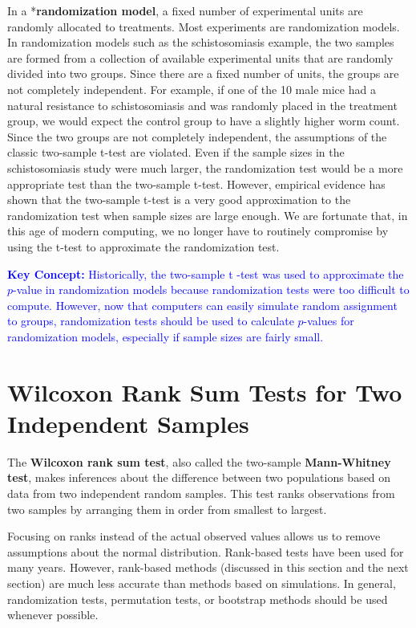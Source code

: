 \documentclass[
]{book}
\begin{document}
In a *\textbf{randomization model}, a fixed number of experimental units are randomly allocated to treatments. Most experiments are randomization models. In randomization models such as the schistosomiasis example, the two samples are formed from a collection of available experimental units that are randomly divided into two groups. Since there are a fixed number of units, the groups are not completely independent. For example, if one of the 10 male mice had a natural resistance to schistosomiasis and was randomly placed in the treatment group, we would expect the control group to have a slightly higher worm count. Since the two groups are not completely independent, the assumptions of the classic two-sample t-test are violated. Even if the sample sizes in the schistosomiasis study were much larger, the randomization test would be a more appropriate test than the two-sample t-test. However, empirical evidence has shown that the two-sample t-test is a very good approximation to the randomization test when sample sizes are large enough. We are fortunate that, in this age of modern computing, we no longer have to routinely compromise by using the t-test to approximate the randomization test.

\textbf{\textcolor{blue}{Key Concept:}}
\textcolor{blue}{Historically, the two-sample t -test was used to approximate the $p$-value in randomization models because randomization tests were too difficult to compute. However, now that computers can easily simulate random assignment to groups, randomization tests should be used to calculate $p$-values for randomization models, especially if sample sizes are fairly small.}

\hypertarget{wilcoxon-rank-sum-tests-for-two-independent-samples}{%
\section{Wilcoxon Rank Sum Tests for Two Independent Samples}\label{wilcoxon-rank-sum-tests-for-two-independent-samples}}

The \textbf{Wilcoxon rank sum test}, also called the two-sample \textbf{Mann-Whitney test}, makes inferences about the difference between two populations based on data from two independent random samples. This test ranks observations from two samples by arranging them in order from smallest to largest.

Focusing on ranks instead of the actual observed values allows us to remove assumptions about the normal distribution. Rank-based tests have been used for many years. However, rank-based methods (discussed in this section and the next section) are much less accurate than methods based on simulations. In general, randomization tests, permutation tests, or bootstrap methods should be used whenever possible.
\end{document}
